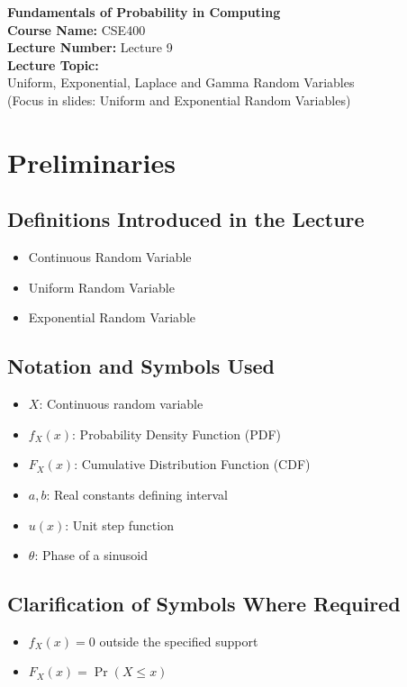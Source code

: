 \documentclass[12pt]{article}
\begin{document}
\begin{center}
{\Large \textbf{Fundamentals of Probability in Computing}}\\[0.4cm]

\textbf{Course Name:} CSE400\\[0.2cm]
\textbf{Lecture Number:} Lecture 9\\[0.2cm]

\textbf{Lecture Topic:}\\
Uniform, Exponential, Laplace and Gamma Random Variables\\
(Focus in slides: Uniform and Exponential Random Variables)
\end{center}


\section{Preliminaries}

\subsection{Definitions Introduced in the Lecture}
\begin{itemize}
    \item Continuous Random Variable
    \item Uniform Random Variable
    \item Exponential Random Variable
\end{itemize}

\subsection{Notation and Symbols Used}
\begin{itemize}
    \item $X$: Continuous random variable
    \item $f_X(x)$: Probability Density Function (PDF)
    \item $F_X(x)$: Cumulative Distribution Function (CDF)
    \item $a, b$: Real constants defining interval
    \item $u(x)$: Unit step function
    \item $\theta$: Phase of a sinusoid
\end{itemize}

\subsection{Clarification of Symbols Where Required}
\begin{itemize}
    \item $f_X(x)=0$ outside the specified support
    \item $F_X(x)=\Pr(X \le x)$
\end{itemize}
\end{document}
